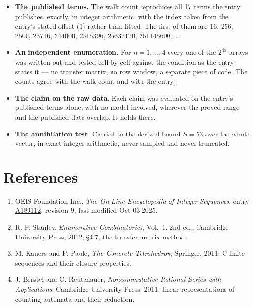 \documentclass[11pt]{article}
\theoremstyle{definition}
\begin{document}
\begin{itemize}

\item {\bfseries The published terms.} The walk count reproduces all 17 terms the entry publishes, exactly, in integer arithmetic, with the index taken from the entry's stated offset (1) rather than fitted. The first of them are 16, 256, 2500, 23716, 244000, 2515396, 25632120, 261145600,~\dots

\item {\bfseries An independent enumeration.} For $n = 1,\dots,4$ every one of the $2^{4n}$ arrays was written out and tested cell by cell against the condition as the entry states it --- no transfer matrix, no row window, a separate piece of code. The counts agree with the walk count and with the entry.

\item {\bfseries The claim on the raw data.} Each claim was evaluated on the entry's published terms alone, with no model involved, wherever the proved range and the published data overlap. It holds there.

\item {\bfseries The annihilation test.} Carried to the derived bound $S = 53$ over the whole vector, in exact integer arithmetic, never sampled and never truncated.

\end{itemize}

\section{References}

\begin{enumerate}

\item OEIS Foundation Inc., \emph{The On-Line Encyclopedia of Integer Sequences}, entry \href{https://oeis.org/A189112}{A189112}, revision 9, last modified Oct 03 2025.

\item R. P. Stanley, \emph{Enumerative Combinatorics}, Vol.~1, 2nd ed., Cambridge University Press, 2012; \S4.7, the transfer-matrix method.

\item M. Kauers and P. Paule, \emph{The Concrete Tetrahedron}, Springer, 2011; C-finite sequences and their closure properties.

\item J. Berstel and C. Reutenauer, \emph{Noncommutative Rational Series with Applications}, Cambridge University Press, 2011; linear representations of counting automata and their reduction.

\end{enumerate}
\end{document}
